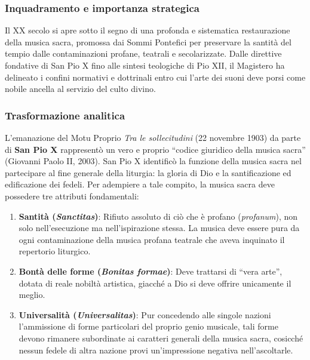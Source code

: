 \documentclass[12pt,a4paper]{article}
\begin{document}
	\subsubsection{Inquadramento e importanza strategica}\label{inquadramento-e-importanza-strategica-1}
	
	Il XX secolo si apre sotto il segno di una profonda e sistematica restaurazione della musica sacra, promossa dai Sommi Pontefici per preservare la santità del tempio dalle contaminazioni profane, teatrali e secolarizzate. Dalle direttive fondative di San Pio X fino alle sintesi teologiche di Pio XII, il Magistero ha delineato i confini normativi e dottrinali entro cui l'arte dei suoni deve porsi come nobile ancella al servizio del culto divino.
	
	\subsubsection{Trasformazione analitica}\label{trasformazione-analitica-1}
	
	L'emanazione del Motu Proprio \emph{Tra le sollecitudini} (22 novembre 1903) da parte di \textbf{San Pio X} rappresentò un vero e proprio ``codice giuridico della musica sacra'' (Giovanni Paolo II, 2003). San Pio X identificò la funzione della musica sacra nel partecipare al fine generale della liturgia: la gloria di Dio e la santificazione ed edificazione dei fedeli. Per adempiere a tale compito, la musica sacra deve possedere tre attributi fondamentali:
	
	\begin{enumerate}[label=\arabic*.,leftmargin=*]
		\item \textbf{Santità (\emph{Sanctitas})}: Rifiuto assoluto di ciò che è profano (\emph{profanum}), non solo nell'esecuzione ma nell'ispirazione stessa. La musica deve essere pura da ogni contaminazione della musica profana teatrale che aveva inquinato il repertorio liturgico.
		\item \textbf{Bontà delle forme (\emph{Bonitas formae})}: Deve trattarsi di ``vera arte'', dotata di reale nobiltà artistica, giacché a Dio si deve offrire unicamente il meglio.
		\item \textbf{Universalità (\emph{Universalitas})}: Pur concedendo alle singole nazioni l'ammissione di forme particolari del proprio genio musicale, tali forme devono rimanere subordinate ai caratteri generali della musica sacra, cosicché nessun fedele di altra nazione provi un'impressione negativa nell'ascoltarle.
	\end{enumerate}
	
\end{document}
